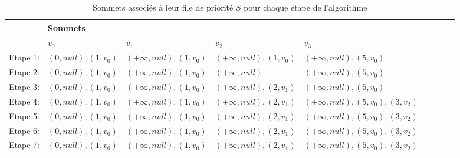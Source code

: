 \begin{exemple}
\begin{figure}[ht!]
\end{figure}

	

\begin{table}[]
	
\caption{Sommets associés à leur file de priorité $S$ pour chaque étape de l'algorithme}
\label{tab:filePrior}

\begin{tabular}{l|l|l|l|l|l|l|l|l|}
\cline{2-5}
                               & Sommets &    &    &      \\ \hline
\multicolumn{1}{|l|}{}         & $v_{0}$ &$v_{1}$  & $v_{2}$ &$v_{3}$  \\ \hline
\multicolumn{1}{|l|}{Etape 1:} & $(0,null),(1,v_{0})$   &$(+\infty,null),(1,v_{0})$     &$(+\infty,null),(1,v_{0})$    &$(+\infty,null),(5,v_{0})$    \\ \hline
\multicolumn{1}{|l|}{Etape 2:} &$(0,null),(1,v_{0})$         &$(+\infty,null),(1,v_{0})$    &$(+\infty,null)$    &$(+\infty,null),(5,v_{0})$     \\ \hline
\multicolumn{1}{|l|}{Etape 3:} &$(0,null),(1,v_{0})$         &$(+\infty,null),(1,v_{0})$    &$(+\infty,null),(2,v_{1})$    &$(+\infty,null),(5,v_{0})$  \\ \hline
\multicolumn{1}{|l|}{Etape 4:} &$(0,null),(1,v_{0})$         &$(+\infty,null),(1,v_{0})$    &$(+\infty,null),(2,v_{1})$    &$(+\infty,null),(5,v_{0}),(3,v_{2})$   \\ \hline
\multicolumn{1}{|l|}{Etape 5:}   &$(0,null),(1,v_{0})$         &$(+\infty,null),(1,v_{0})$    &$(+\infty,null),(2,v_{1})$    &$(+\infty,null),(5,v_{0}),(3,v_{2})$    \\ \hline 
\multicolumn{1}{|l|}{Etape 6:}   &$(0,null),(1,v_{0})$         &$(+\infty,null),(1,v_{0})$    &$(+\infty,null),(2,v_{1})$    &$(+\infty,null),(5,v_{0}),(3,v_{2})$     \\ \hline
\multicolumn{1}{|l|}{Etape 7:}   &$(0,null),(1,v_{0})$         &$(+\infty,null),(1,v_{0})$    &$(+\infty,null),(2,v_{1})$    &$(+\infty,null),(5,v_{0}),(3,v_{2})$   \\ \hline


\end{tabular}
\end{table}
\end{exemple}
